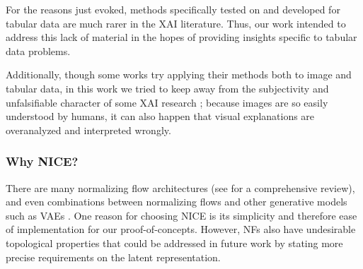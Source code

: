 \documentclass[../main.tex]{subfiles}
\begin{document}
For the reasons just evoked, methods specifically tested on and developed for tabular data are much rarer in the XAI literature.
Thus, our work intended to address this lack of material in the hopes of providing insights specific to tabular data problems.

Additionally, though some works try applying their methods both to image and tabular data, in this work we tried to keep away from the subjectivity and unfalsifiable character of some XAI research \cite{leavittFalsifiable2020}; because images are so easily understood by humans, it can also happen that visual explanations are overanalyzed and interpreted wrongly.

\subsubsection{Why NICE?}

There are many normalizing flow architectures \cite{dinhNICE2015, kingmaGlow2018, dinhDensity2022} (see \cite{kobyzevNormalizing2021} for a comprehensive review), and even combinations between normalizing flows and other generative models such as VAEs \cite{rezendeVariational2015}.
One reason for choosing NICE is its simplicity and therefore ease of implementation for our proof-of-concepts.
However, NFs also have undesirable topological properties \cite{cornishRelaxing2020} that could be addressed in future work by
stating more precise requirements on the latent representation.
\end{document}
